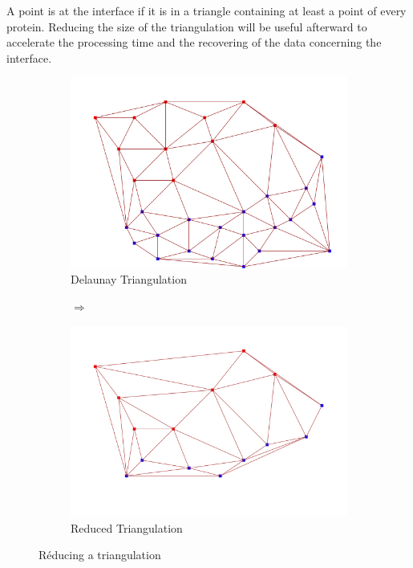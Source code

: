 A point is at the interface if it is in a triangle containing at least
a point of every protein. Reducing the size of the triangulation will
be useful afterward to accelerate the processing time and the recovering of the data
concerning the interface.

\begin{figure}[ht]
\centering
\begin{subfigure}{0.4\textwidth}
  \centering
  \includegraphics[width=\textwidth]{figures/delaunay.png}
  \caption{Delaunay Triangulation}
  \label{fig::delaunay_tr}
\end{subfigure}%
\begin{subfigure}{0.2\textwidth}
  \centering
  $\Longrightarrow$
\end{subfigure}%
\begin{subfigure}{0.4\textwidth}
  \centering
  \includegraphics[width=\textwidth]{figures/delaunay_reduced.png}
  \caption{Reduced Triangulation}
  \label{fig::delaunay_reduced}
\end{subfigure}
\caption{Réducing a triangulation}
\label{fig::delaunays}
\end{figure}

